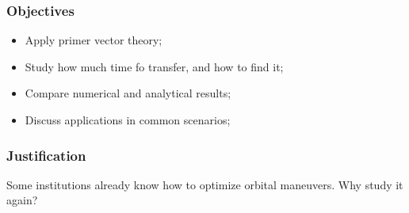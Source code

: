\documentclass{beamer}
\begin{document}
\begin{frame}
    \frametitle{Objectives}

    \begin{itemize}
        \item Apply primer vector theory;
        \item Study how much time fo transfer, and how to find it;
        \item Compare numerical and analytical results;
        \item Discuss applications in common scenarios;
    \end{itemize}

\end{frame}

\begin{frame}
    \frametitle{Justification}

    Some institutions already know how to optimize orbital maneuvers. Why study it again?


\end{frame}
\end{document}
